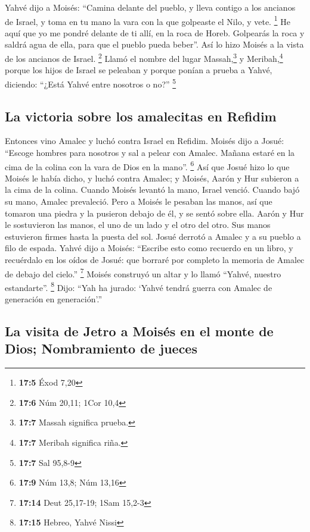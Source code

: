  Yahvé dijo a Moisés: ``Camina delante del pueblo, y lleva
contigo a los ancianos de Israel, y toma en tu mano la vara con la que
golpeaste el Nilo, y vete. \footnote{\textbf{17:5} Éxod 7,20}
 He aquí que yo me pondré delante de ti allí, en la roca
de Horeb. Golpearás la roca y saldrá agua de ella, para que el pueblo
pueda beber''. Así lo hizo Moisés a la vista de los ancianos de Israel.
\footnote{\textbf{17:6} Núm 20,11; 1Cor 10,4}  Llamó el
nombre del lugar Massah,\footnote{\textbf{17:7} Massah significa prueba.}
y Meribah,\footnote{\textbf{17:7} Meribah significa riña.} porque los
hijos de Israel se peleaban y porque ponían a prueba a Yahvé, diciendo:
``¿Está Yahvé entre nosotros o no?'' \footnote{\textbf{17:7} Sal 95,8-9}

\hypertarget{la-victoria-sobre-los-amalecitas-en-refidim}{%
\subsection{La victoria sobre los amalecitas en
Refidim}\label{la-victoria-sobre-los-amalecitas-en-refidim}}

 Entonces vino Amalec y luchó contra Israel en Refidim.
 Moisés dijo a Josué: ``Escoge hombres para nosotros y sal
a pelear con Amalec. Mañana estaré en la cima de la colina con la vara
de Dios en la mano''. \footnote{\textbf{17:9} Núm 13,8; Núm 13,16}
 Así que Josué hizo lo que Moisés le había dicho, y luchó
contra Amalec; y Moisés, Aarón y Hur subieron a la cima de la colina.
 Cuando Moisés levantó la mano, Israel venció. Cuando
bajó su mano, Amalec prevaleció.  Pero a Moisés le
pesaban las manos, así que tomaron una piedra y la pusieron debajo de
él, y se sentó sobre ella. Aarón y Hur le sostuvieron las manos, el uno
de un lado y el otro del otro. Sus manos estuvieron firmes hasta la
puesta del sol.  Josué derrotó a Amalec y a su pueblo a
filo de espada.  Yahvé dijo a Moisés: ``Escribe esto como
recuerdo en un libro, y recuérdalo en los oídos de Josué: que borraré
por completo la memoria de Amalec de debajo del cielo.'' \footnote{\textbf{17:14}
  Deut 25,17-19; 1Sam 15,2-3}  Moisés construyó un altar
y lo llamó ``Yahvé, nuestro estandarte''. \footnote{\textbf{17:15}
  Hebreo, Yahvé Nissi}  Dijo: ``Yah ha jurado: `Yahvé
tendrá guerra con Amalec de generación en generación'.''

\hypertarget{la-visita-de-jetro-a-moisuxe9s-en-el-monte-de-dios-nombramiento-de-jueces}{%
\subsection{La visita de Jetro a Moisés en el monte de Dios;
Nombramiento de
jueces}\label{la-visita-de-jetro-a-moisuxe9s-en-el-monte-de-dios-nombramiento-de-jueces}}


